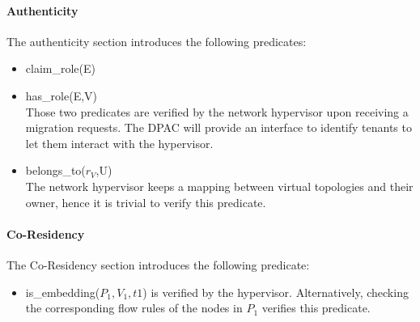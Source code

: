 \paragraph{Authenticity}
The authenticity section introduces the following predicates:
\begin{itemize}

\item claim\_role(E)
\item has\_role(E,V)
\\
Those two predicates are verified by the network hypervisor upon receiving a migration requests.
The DPAC will provide an interface to identify tenants to let them interact with the hypervisor.
\item belongs\_to($r_V$,U)
\\
The network hypervisor keeps a mapping between virtual topologies and their owner, hence it is trivial to verify this predicate.
\end{itemize}
 
 
\paragraph{Co-Residency}
The Co-Residency section introduces the following predicate:

\begin{itemize}
    \item is\_embedding($P_1,V_1,t1$) is verified by the hypervisor. Alternatively, checking the corresponding flow rules of the nodes in $P_1$ verifies this predicate.
\end{itemize}